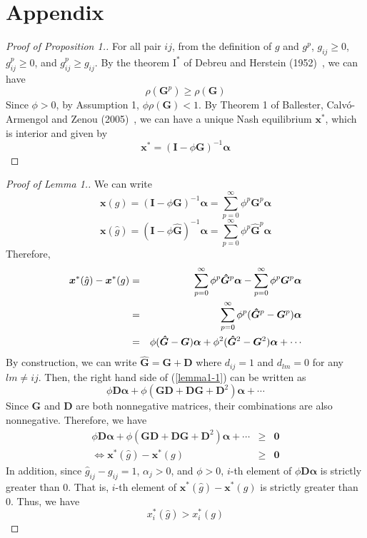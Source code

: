 \documentclass[12pt]{article}
\theoremstyle{definition}
\begin{document}
\section{Appendix}

\begin{proof}[Proof of Proposition 1.]
	For all pair $ij$, from the definition of $g$ and $g^p$, $g_{ij} \ge 0$, $g_{ij}^p \ge 0$, and $g_{ij}^p \ge g_{ij}$.
	By the theorem $\text{I}^*$ of Debreu and Herstein (1952)~\cite{debreu}, we can have
	\[ \rho(\bm{G}^p) \ge \rho(\bm{G})  \]
	Since $\phi > 0$, by Assumption 1, $\phi \rho(\bm{G}) < 1$.
	By Theorem 1 of Ballester, Calv\'{o}-Armengol and Zenou (2005)~\cite{whowho}, we can have a unique Nash equilibrium $\bm{x}^*$, which is interior and given by
	\[ \bm{x}^* = {(\bm{I} - \phi \bm{G})}^{-1} \bm{\alpha} \] 
\end{proof}

\begin{proof}[Proof of Lemma 1.]
	We can write
	\[ \bm{x}(g) = {(\bm{I} - \phi \bm{G})}^{-1} \bm{\alpha} = \sum_{p=0}^{\infty} \phi^p \bm{G}^p \bm{\alpha} \]
	\[ \bm{x}(\hat{g}) = {(\bm{I} - \phi \bm{\hat{G}})}^{-1} \bm{\alpha} = \sum_{p=0}^{\infty} \phi^p \bm{\hat{G}}^p \bm{\alpha} \]
	Therefore,
	\begin{eqnarray}
		\label{lemma1-1}
		\bm{x}^*(\hat{g}) - \bm{x}^*(g) &=& \sum_{p=0}^{\infty} \phi^p \bm{\hat{G}}^p \bm{\alpha} - \sum_{p=0}^{\infty} \phi^p \bm{G}^p \bm{\alpha} \notag \\
										&=& \sum_{p=0}^{\infty} \phi^p (\bm{\hat{G}}^p - \bm{G}^p) \bm{\alpha} \notag \\
										&=& \phi (\bm{\hat{G}} - \bm{G}) \bm{\alpha} + \phi^2 (\bm{\hat{G}}^2 - \bm{G}^2) \bm{\alpha} + \cdots
	\end{eqnarray}
	By construction, we can write $\bm{\hat{G}} = \bm{G} + \bm{D}$ where $d_{ij} = 1$ and $d_{lm} = 0$ for any $lm \neq ij$.
	Then, the right hand side of (\ref{lemma1-1}) can be written as
	\[ \phi \bm{D} \bm{\alpha} + \phi (\bm{G} \bm{D} + \bm{D} \bm{G} + \bm{D}^2) \bm{\alpha} + \cdots \]
	Since $\bm{G}$ and $\bm{D}$ are both nonnegative matrices, their combinations are also nonnegative.
	Therefore, we have
	\begin{eqnarray*}
		\phi \bm{D} \bm{\alpha} + \phi (\bm{G} \bm{D} + \bm{D} \bm{G} + \bm{D}^2) \bm{\alpha} + \cdots &\ge& \bm{0} \\
		\Leftrightarrow \bm{x}^*(\hat{g}) - \bm{x}^*(g) &\ge& \bm{0}
	\end{eqnarray*}
	In addition, since $\hat{g}_{ij} - g_{ij} = 1$, $\alpha_j > 0$, and $\phi > 0$, $i$-th element of $\phi \bm{D} \bm{\alpha}$ is strictly greater than $0$.
	That is, $i$-th element of $\bm{x}^*(\hat{g}) - \bm{x}^*(g)$ is strictly greater than $0$.
	Thus, we have
	\[ x_i^*(\hat{g}) > x_i^*(g) \]
\end{proof}
\end{document}

